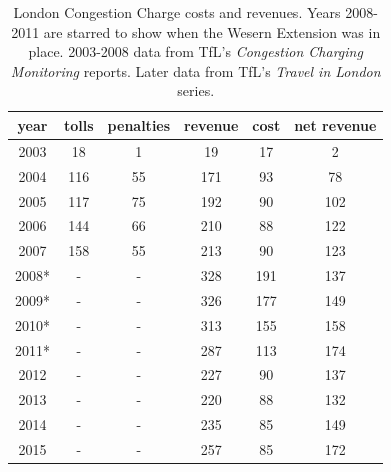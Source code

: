 \begin{table}[ht]
\begin{tabular}{|c|c|c|c|c|c|}
\hline 
year & tolls & penalties & revenue & cost & net revenue\tabularnewline
\hline 
\hline 
2003 & 18 & 1 & 19 & 17 & 2\tabularnewline
\hline 
2004 & 116 & 55 & 171 & 93 & 78\tabularnewline
\hline 
2005 & 117 & 75 & 192 & 90 & 102\tabularnewline
\hline 
2006 & 144 & 66 & 210 & 88 & 122\tabularnewline
\hline 
2007 & 158 & 55 & 213 & 90 & 123\tabularnewline
\hline 
2008{*} & - & - & 328 & 191 & 137\tabularnewline
\hline 
2009{*} & - & - & 326 & 177 & 149\tabularnewline
\hline 
2010{*} & - & - & 313 & 155 & 158\tabularnewline
\hline 
2011{*} & - & - & 287 & 113 & 174\tabularnewline
\hline 
2012 & - & - & 227 & 90 & 137\tabularnewline
\hline 
2013 & - & - & 220 & 88 & 132\tabularnewline
\hline 
2014 & - & - & 235 & 85 & 149\tabularnewline
\hline 
2015 & - & - & 257 & 85 & 172\tabularnewline
\hline 
\end{tabular}

\caption{London Congestion Charge costs and revenues. Years 2008-2011 are starred to show when the Wesern Extension was in place. 2003-2008 data from TfL's \emph{Congestion Charging Monitoring} reports. Later data from TfL's \emph{Travel in London} series. }\label{tab:London-Congestion-Charge}
\end{table}